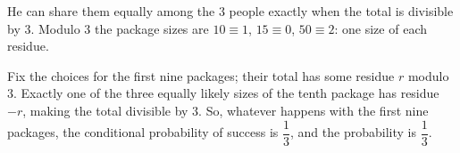 He can share them equally among the $3$ people exactly when the total is divisible by $3$. Modulo $3$ the package sizes are $10\equiv1$, $15\equiv0$, $50\equiv2$: one size of each residue.

Fix the choices for the first nine packages; their total has some residue $r$ modulo $3$. Exactly one of the three equally likely sizes of the tenth package has residue $-r$, making the total divisible by $3$. So, whatever happens with the first nine packages, the conditional probability of success is $\dfrac{1}{3}$, and the probability is $\boxed{\dfrac{1}{3}}$.
